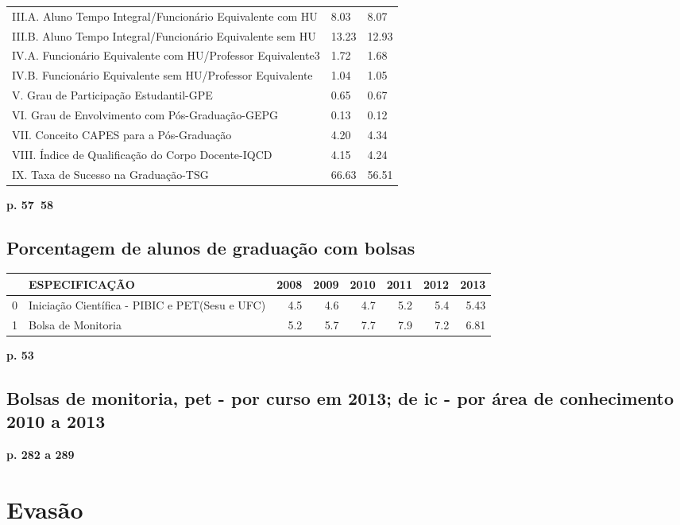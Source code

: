 \documentclass{report}
\begin{document}
\begin{tabular}{lll}
III.A. Aluno Tempo Integral/Funcionário Equivalente com HU  &  8.03 &  8.07 \\
III.B. Aluno Tempo Integral/Funcionário Equivalente sem HU  &  13.23 &  12.93 \\
IV.A. Funcionário Equivalente com HU/Professor Equivalente3 &  1.72 &  1.68 \\
IV.B. Funcionário Equivalente sem HU/Professor Equivalente  &  1.04 &  1.05 \\
V. Grau de Participação Estudantil-GPE                      &  0.65 &  0.67 \\
VI. Grau de Envolvimento com Pós-Graduação-GEPG             &  0.13 &  0.12 \\
VII. Conceito CAPES para a Pós-Graduação                    &  4.20 &  4.34 \\
VIII. Índice de Qualificação do Corpo Docente-IQCD          &  4.15 &  4.24 \\
IX. Taxa de Sucesso na Graduação-TSG                        &  66.63 &  56.51 \\
\bottomrule
\end{tabular}
\textbf{p. 57~58}

\subsection{Porcentagem de alunos de graduação com bolsas}
\begin{tabular}{llrrrrrr}
\toprule
{} &                                   ESPECIFICAÇÃO &  2008 &  2009 &  2010 &  2011 &  2012 &  2013 \\
\midrule
0 &  Iniciação Científica - PIBIC e PET(Sesu e UFC) &   4.5 &   4.6 &   4.7 &   5.2 &   5.4 &  5.43 \\
1 &                              Bolsa de Monitoria &   5.2 &   5.7 &   7.7 &   7.9 &   7.2 &  6.81 \\
\bottomrule
\end{tabular}

\textbf{p. 53}

\subsection{Bolsas de monitoria, pet - por curso em 2013; de ic - por área de conhecimento 2010 a 2013}
\textbf{p. 282 a 289}

\section{Evasão}
\cite{esclarecimentos_calculos}
\cite{mudanca_calculos}
\end{document}
